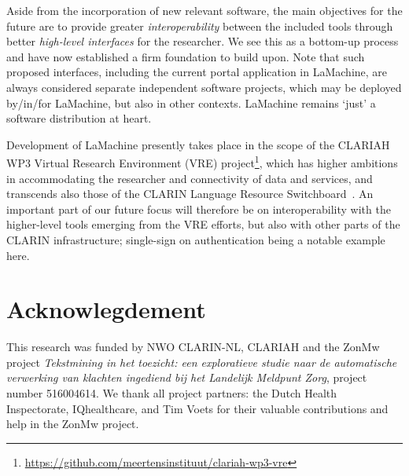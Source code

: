 \documentclass[a4paper,11pt]{article}
\begin{document}
Aside from the incorporation of new relevant software, the main objectives for the future are to provide
greater \emph{interoperability} between the included tools through better \emph{high-level interfaces} for the
researcher. We see this as a bottom-up process and have now established a firm foundation to build upon. Note that such
proposed interfaces, including the current portal application in LaMachine, are always considered separate independent
software projects, which may be deployed by/in/for LaMachine, but also in other contexts. LaMachine remains `just'
a software distribution at heart.

Development of LaMachine presently takes place in the scope of the CLARIAH WP3 Virtual Research Environment (VRE)
project\footnote{\url{https://github.com/meertensinstituut/clariah-wp3-vre}}, which has higher ambitions in
accommodating the researcher and connectivity of data and services, and transcends also those of the CLARIN Language
Resource Switchboard~\cite{switchboard}. An important part of our future focus will therefore be on interoperability
with the higher-level tools emerging from the VRE efforts, but also with other parts of the CLARIN infrastructure;
single-sign on authentication being a notable example here.

\section*{Acknowlegdement}

This research was funded by NWO CLARIN-NL, CLARIAH and the ZonMw project {\it Tekstmining in het toezicht: een exploratieve studie naar de automatische verwerking van klachten ingediend bij het Landelijk Meldpunt Zorg}, project number 516004614. We thank all project partners: the Dutch Health Inspectorate, IQhealthcare, and Tim Voets for their valuable contributions and help in the ZonMw project.



\end{document}
